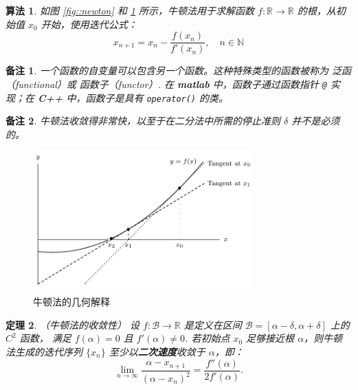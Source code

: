 \documentclass[a4paper]{ctexart}
\newtheorem{theorem}{定理}
\newtheorem{remark}{备注}
\newtheorem{algorithm}[theorem]{算法}
\numberwithin{theorem}{section}
\numberwithin{equation}{section}
\numberwithin{figure}{section}
\numberwithin{remark}{section}
\begin{document}
\begin{algorithm}
    \label{alg::newton}
如图 \ref{fig::newton} 和 \ref{fig::geo_newton} 所示，牛顿法用于求解函数 \(f : \mathbb{R} \rightarrow \mathbb{R}\) 的根，从初始值 \(x_0\) 开始，使用迭代公式：
\begin{equation}
    \label{eq::newton}
x_{n+1} = x_n - \frac{f(x_n)}{f'(x_n)}, \quad n \in \mathbb{N}
\end{equation}
\end{algorithm}

\begin{remark}
一个函数的自变量可以包含另一个函数。这种特殊类型的函数被称为 \textit{泛函}（functional）或 \textit{函数子}（functor）. 
在 \textbf{matlab} 中，函数子通过函数指针 \texttt{@} 实现；在 \textbf{C++} 中，函数子是具有 \texttt{operator()} 的类。
\end{remark}

\begin{remark}
牛顿法收敛得非常快，以至于在二分法中所需的停止准则 \(\delta\) 并不是必须的。
\end{remark}

\begin{figure}
\centering
\includegraphics[width=0.75\textwidth]{images/geo_newton.png}
\caption{牛顿法的几何解释}
\label{fig::geo_newton}
\end{figure}

\begin{theorem}
    \label{thm::newton}
（牛顿法的收敛性）  
设 \( f : \mathcal{B} \to \mathbb{R} \) 是定义在区间 \( \mathcal{B} = [\alpha - \delta, \alpha + \delta] \) 上的 \( C^2 \) 函数，
满足 \( f(\alpha) = 0 \) 且 \( f'(\alpha) \ne 0 \). 
若初始点 \( x_0 \) 足够接近根 \(\alpha\)，则牛顿法生成的迭代序列 \(\{x_n\}\) 至少以\textbf{二次速度}收敛于 \(\alpha\)，即：
\begin{equation}
\lim_{n \to \infty} \frac{\alpha - x_{n+1}}{(\alpha - x_n)^2} = \frac{f''(\alpha)}{2f'(\alpha)}.     
\end{equation}    
\end{theorem}
\end{document}
